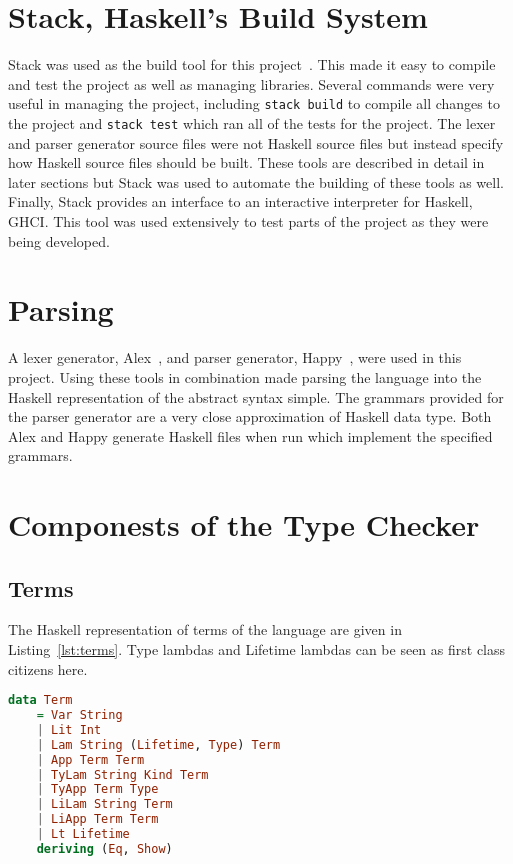 \section{Stack, Haskell's Build System}
Stack was used as the build tool for this project~\cite{stack}. This made it
easy to compile and test the project as well as managing libraries. Several
commands were very useful in managing the project, including \lstinline{stack build}
to compile all changes to the project and \lstinline{stack test} which
ran all of the tests for the project. The lexer and parser generator source
files were not Haskell source files but instead specify how Haskell source
files should be built. These tools are described in detail in later sections
but Stack was used to automate the building of these tools as well. Finally,
Stack provides an interface to an interactive interpreter for Haskell, GHCI.
This tool was used extensively to test parts of the project as they were being
developed.

\section{Parsing}
A lexer generator, Alex~\cite{alex}, and parser generator, Happy~\cite{happy},
were used in this project. Using these tools in combination made parsing the
language into the Haskell representation of the abstract syntax simple.  The
grammars provided for the parser generator are a very close approximation of
Haskell data type. Both Alex and Happy generate Haskell files when run which
implement the specified grammars.


\section{Componests of the Type Checker}
\subsection{Terms}
The Haskell representation of terms of the language are given in
Listing~\ref{lst:terms}.  Type lambdas and Lifetime lambdas can be seen as
first class citizens here.

\begin{lstlisting}[caption=Haskell representation of Terms., language=Haskell, label={lst:terms}]
data Term
    = Var String
    | Lit Int
    | Lam String (Lifetime, Type) Term
    | App Term Term
    | TyLam String Kind Term 
    | TyApp Term Type
    | LiLam String Term
    | LiApp Term Term
    | Lt Lifetime
    deriving (Eq, Show)
\end{lstlisting}


